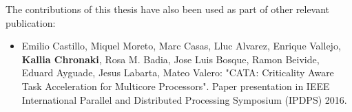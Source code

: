 The contributions of this thesis have also been used as part of other relevant publication:
\begin{itemize}
	\item \cite{CATA} Emilio Castillo, Miquel Moreto, Marc Casas, Lluc Alvarez, Enrique Vallejo, \textbf{Kallia Chronaki}, Rosa M. Badia, Jose Luis Bosque, Ramon Beivide, Eduard Ayguade, Jesus Labarta, Mateo Valero: "CATA: Criticality Aware Task Acceleration for Multicore Processors".
	Paper presentation in IEEE International Parallel and Distributed Processing Symposium (IPDPS) 2016.
\end{itemize}
%
%
%
%
%




